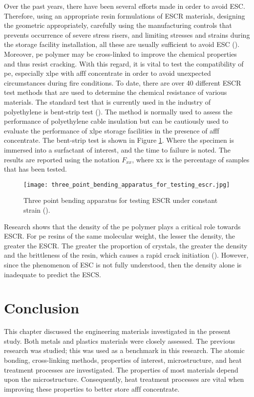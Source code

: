 Over the past years, there have been several efforts made in order to avoid ESC. Therefore, using an appropriate resin formulations of ESCR materials, designing the geometric appropriately, carefully using the manufacturing controls that prevents occurrence of severe stress risers, and limiting stresses and strains during the storage facility installation, all these are usually sufficient to avoid ESC (\cite{gabriel1998history}). Moreover, \acrshort{pe} polymer may be cross-linked to improve the chemical properties and thus resist cracking.  With this regard, it is vital to test the compatibility of \acrshort{pe}, especially \acrshort{xlpe} with \acrshort{afff} concentrate in order to avoid unexpected circumstances during fire conditions. To date, there are over 40 different ESCR test methods that are used to determine the chemical resistance of various materials. The standard test that is currently used in the industry of polyethylene is bent-strip test (\cite{gabriel1998history}). The method is normally used to assess the performance of polyethylene cable insulation but can be cautiously used to evaluate the performance of \acrshort{xlpe} storage facilities in the presence of \acrshort{afff} concentrate. The bent-strip test is shown in Figure \ref{ch3:figure:bending_apparatus}. Where the specimen is immersed into a surfactant of interest, and the time to failure is noted. The results are reported using the notation $F_{xx}$, where xx is the percentage of samples that has been tested.
 
\begin{figure}[H]
    \centering
    \texttt{[image: three\_point\_bending\_apparatus\_for\_testing\_escr.jpg]}
    \caption{Three point bending apparatus for testing ESCR under constant strain (\cite{choi2009modeling}).}
    \label{ch3:figure:bending_apparatus}
\end{figure}

Research shows that the density of the \acrshort{pe} polymer plays a critical role towards ESCR. For \acrshort{pe} resins of the same molecular weight, the lesser the density, the greater the ESCR. The greater the proportion of crystals, the greater the density and the brittleness of the resin, which causes a rapid crack initiation (\cite{gabriel1998history}). However, since the phenomenon of ESC is not fully understood, then the density alone is inadequate to predict the ESCS.

\section{Conclusion}
This chapter discussed the engineering materials investigated in the present study. Both metals and plastics materials were closely assessed. The previous research was studied; this was used as a benchmark in this research. The atomic bonding, cross-linking methods, properties of interest, microstructure, and heat treatment processes are investigated. The properties of most materials depend upon the microstructure. Consequently, heat treatment processes are vital when improving these properties to better store \acrshort{afff} concentrate.

